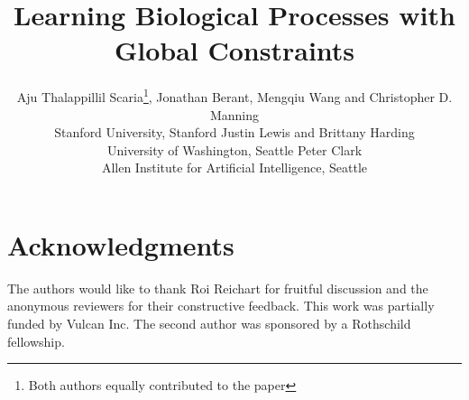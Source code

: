 \documentclass[11pt,letterpaper]{article}
\title{Learning Biological Processes with Global Constraints}
\author{\small{Aju Thalappillil Scaria\thanks{\hspace{5pt}Both authors equally contributed to the paper}, Jonathan Berant\samethanks, Mengqiu Wang and Christopher D. Manning} \\ \small{Stanford University, Stanford}
         \AND
         \small{Justin Lewis and Brittany Harding} \\ \small{University of Washington, Seattle}
         \And
         \small{Peter Clark} \\ \small{Allen Institute for Artificial Intelligence, Seattle}}
\begin{document}
\maketitle

 
 \label{sec:intro}
 \label{sec:process}
 \label{sec:model}
 \label{sec:experiment}
 \label{sec:related}
 \label{sec:conclusion}

\section*{Acknowledgments}
The authors would like to thank Roi Reichart for fruitful discussion and 
the anonymous reviewers for their constructive feedback.
This work was partially funded by Vulcan Inc. 
The second author was sponsored by a Rothschild fellowship. 



\end{document}
